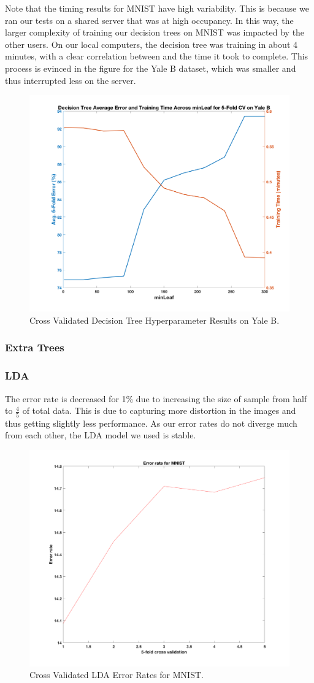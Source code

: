Note that the timing results for MNIST have high variability. This is because we ran our tests on a shared server that was at high occupancy. In this way, the larger complexity of training our decision trees on MNIST was impacted by the other users. On our local computers, the decision tree was training in about 4 minutes, with a clear correlation between  and the time it took to complete. This process is evinced in the figure for the Yale B dataset, which was smaller and thus interrupted less on the server.
%
\begin{figure}[H]
  \centering\includegraphics[width=0.6\columnwidth]{../images/cv_dt_yaleb}
  \caption{Cross Validated Decision Tree Hyperparameter Results on Yale B.}
\end{figure}

\subsubsection{Extra Trees}

\subsubsection{LDA}
The error rate is decreased for 1\% due to increasing the size of sample from half to $\frac{4}{5}$ of total data. This is due to capturing more distortion in the images and thus getting slightly less performance. As our error rates do not diverge much from each other, the LDA model we used is stable. 
\begin{figure}[H]
	\centering\includegraphics[width=0.6\columnwidth]{../images/cr-err-mnist}
	\caption{Cross Validated LDA Error Rates for MNIST.}
\end{figure}

